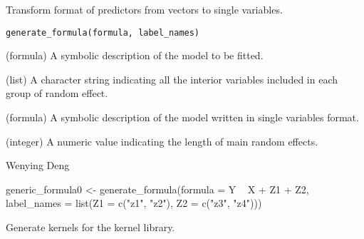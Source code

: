\documentclass[a4paper]{book}
\begin{document}
%
\begin{Description}\relax
Transform format of predictors from vectors to single variables.
\end{Description}
%
\begin{Usage}
\begin{verbatim}
generate_formula(formula, label_names)
\end{verbatim}
\end{Usage}
%
\begin{Arguments}
\begin{ldescription}
\item[\code{formula}] (formula) A symbolic description of the model to be fitted.

\item[\code{label\_names}] (list) A character string indicating all the interior
variables included in each group of random effect.
\end{ldescription}
\end{Arguments}
%
\begin{Value}
\begin{ldescription}
\item[\code{generic\_formula}] (formula) A symbolic description of the model
written in single variables format.

\item[\code{length\_main}] (integer) A numeric value indicating the length of main
random effects.
\end{ldescription}
\end{Value}
%
\begin{Author}\relax
Wenying Deng
\end{Author}
%
\begin{Examples}
\begin{ExampleCode}



generic_formula0 <- generate_formula(formula = Y ~ X + Z1 + Z2,
label_names = list(Z1 = c("z1", "z2"), Z2 = c("z3", "z4")))



\end{ExampleCode}
\end{Examples}
%
\begin{Description}\relax
Generate kernels for the kernel library.
\end{Description}
\end{document}
